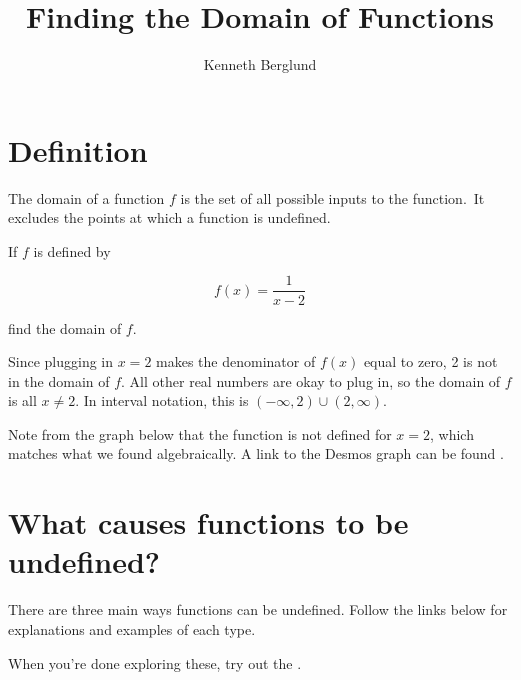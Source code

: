 \documentclass{ximera}
\title{Finding the Domain of Functions}
\author{Kenneth Berglund}
\begin{document}
\begin{abstract}
\end{abstract}
\maketitle

\section{Definition}

The domain of a function $f$ is the set of all possible inputs to the function. It excludes the points at which a function is undefined. 

\begin{example}
If $f$ is defined by 

$$f(x) = \frac{1}{x - 2}$$

find the domain of $f$. 

\begin{explanation}
Since plugging in $x = 2$ makes the denominator of $f(x)$ equal to zero, 2 is not in the domain of $f$. All other real numbers are okay to plug in, so the domain of $f$ is all $x \ne 2$. In interval notation, this is $(-\infty, 2) \cup (2, \infty)$.

Note from the graph below that the function is not defined for $x = 2$, which matches what we found algebraically. A link to the Desmos graph can be found . 

\begin{center}
\end{center}
\end{explanation}
\end{example}

\section{What causes functions to be undefined?}
There are three main ways functions can be undefined. Follow the links below for explanations and examples of each type.




When you're done exploring these, try out the .
\end{document}
